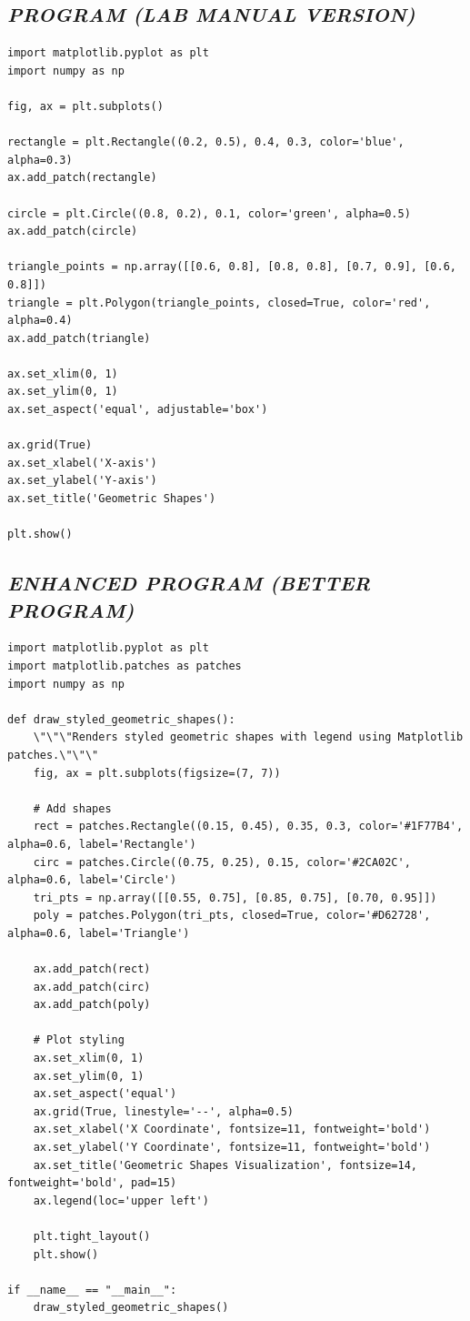 \documentclass[11pt,a4paper]{article}
\begin{document}
\subsection*{\textit{PROGRAM (LAB MANUAL VERSION)}}
\begin{lstlisting}[style=pythonstyle]
import matplotlib.pyplot as plt 
import numpy as np 
 
fig, ax = plt.subplots() 
 
rectangle = plt.Rectangle((0.2, 0.5), 0.4, 0.3, color='blue', alpha=0.3) 
ax.add_patch(rectangle) 
 
circle = plt.Circle((0.8, 0.2), 0.1, color='green', alpha=0.5) 
ax.add_patch(circle) 
 
triangle_points = np.array([[0.6, 0.8], [0.8, 0.8], [0.7, 0.9], [0.6, 0.8]]) 
triangle = plt.Polygon(triangle_points, closed=True, color='red', alpha=0.4) 
ax.add_patch(triangle) 
 
ax.set_xlim(0, 1) 
ax.set_ylim(0, 1) 
ax.set_aspect('equal', adjustable='box') 
 
ax.grid(True) 
ax.set_xlabel('X-axis') 
ax.set_ylabel('Y-axis') 
ax.set_title('Geometric Shapes') 
 
plt.show()
\end{lstlisting}

\subsection*{\textit{ENHANCED PROGRAM (BETTER PROGRAM)}}
\begin{lstlisting}[style=pythonstyle]
import matplotlib.pyplot as plt
import matplotlib.patches as patches
import numpy as np

def draw_styled_geometric_shapes():
    \"\"\"Renders styled geometric shapes with legend using Matplotlib patches.\"\"\"
    fig, ax = plt.subplots(figsize=(7, 7))

    # Add shapes
    rect = patches.Rectangle((0.15, 0.45), 0.35, 0.3, color='#1F77B4', alpha=0.6, label='Rectangle')
    circ = patches.Circle((0.75, 0.25), 0.15, color='#2CA02C', alpha=0.6, label='Circle')
    tri_pts = np.array([[0.55, 0.75], [0.85, 0.75], [0.70, 0.95]])
    poly = patches.Polygon(tri_pts, closed=True, color='#D62728', alpha=0.6, label='Triangle')

    ax.add_patch(rect)
    ax.add_patch(circ)
    ax.add_patch(poly)

    # Plot styling
    ax.set_xlim(0, 1)
    ax.set_ylim(0, 1)
    ax.set_aspect('equal')
    ax.grid(True, linestyle='--', alpha=0.5)
    ax.set_xlabel('X Coordinate', fontsize=11, fontweight='bold')
    ax.set_ylabel('Y Coordinate', fontsize=11, fontweight='bold')
    ax.set_title('Geometric Shapes Visualization', fontsize=14, fontweight='bold', pad=15)
    ax.legend(loc='upper left')

    plt.tight_layout()
    plt.show()

if __name__ == "__main__":
    draw_styled_geometric_shapes()
\end{lstlisting}
\end{document}
